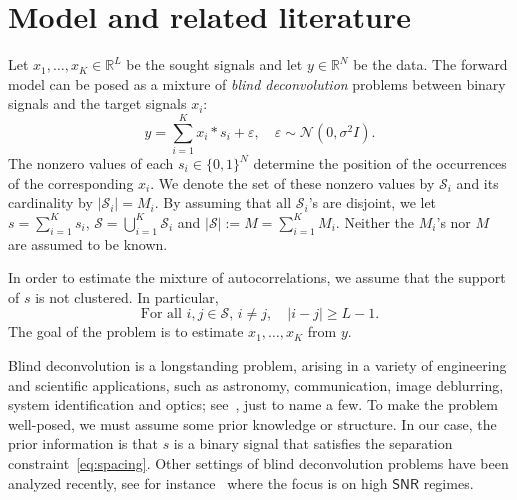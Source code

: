 \documentclass[english,11pt]{article}
\numberwithin{equation}{section}
\theoremstyle{plain}
\theoremstyle{definition}
\theoremstyle{remark}
\theoremstyle{plain}
\theoremstyle{remark}
\theoremstyle{plain}
\theoremstyle{plain}
\newcommand{\RL}{\mathbb{R}^L}
\newcommand{\RN}{\mathbb{R}^N}
\newcommand{\SNR}{{\textsf{SNR}}}
\begin{document}
%


\section{Model and related literature}  \label{sec:model}

Let $x_1,\ldots,x_K\in\RL$ be the sought signals and let $y\in\RN$ be the data. 
The forward model can be posed as a mixture of \emph{blind deconvolution} problems between binary signals and the target signals $x_i$:
\begin{equation} \label{eq:model}
y = \sum_{i=1}^K x_i\ast s_i + \varepsilon,\quad \varepsilon\sim\mathcal{N}(0,\sigma^2 I).
\end{equation}
The nonzero values of each  $s_i\in\{0,1\}^N$ determine the position of the occurrences of the corresponding $x_i$. 
We denote the set of these nonzero values by 
 $\mathcal{S}_i$ and its cardinality by $\vert \mathcal{S}_i\vert = M_i$. 
By assuming that all $\mathcal{S}_i$'s are disjoint,  we let $s = \sum_{i=1}^Ks_i$, $\mathcal{S} = \bigcup_{i=1}^{K} \mathcal{S}_i$ and  $\vert \mathcal{S}\vert :=M =  \sum_{i=1}^{K}M_i$.  Neither the $M_i$'s nor $M$ are assumed to be known. 

In order to estimate the mixture of autocorrelations, we assume that the support of $s$ is not clustered. In particular,
\begin{equation} \label{eq:spacing}
\text{For all }  i,j\in\mathcal{S}, \, i\neq j,  \quad  \vert i-j \vert\geq L-1.  
\end{equation}
The goal of the problem is to estimate $x_1,\ldots,x_K$ from $y$.

Blind deconvolution is a longstanding problem, arising in a variety of engineering and scientific applications, such as astronomy, communication, image deblurring, system identification and optics; see~\cite{jefferies1993restoration,shalvi1990new,ayers1988iterative,abed1997blind}, just to name a few. 
To make the problem well-posed, we must  assume some prior knowledge or  structure. 
In our case, the prior information is that $s$ is a binary signal that satisfies the separation constraint~\eqref{eq:spacing}. 
Other settings of blind deconvolution problems have been analyzed recently, see for instance~\cite{ahmed2014blind,li2016identifiability,li2016rapid,ling2015self,ling2017blind,chi2016guaranteed}
where the focus is on high $\SNR$ regimes.
\end{document}
